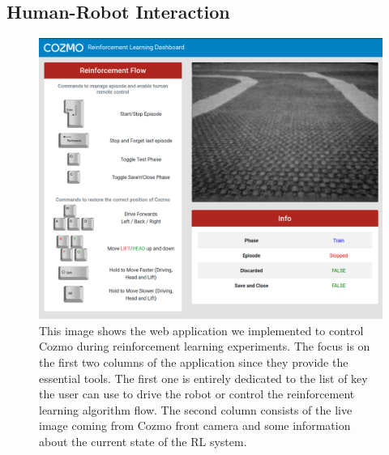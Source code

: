 \subsection{Human-Robot Interaction} \label{subsec:human-robot-interaction}

\begin{figure}

    \centering
    \includegraphics[width=\textwidth]{img/dashboard.png}
    \caption[Web Application implemented to Control Cozmo]{This image shows the web application we implemented to control Cozmo during reinforcement learning experiments.
        The focus is on the first two columns of the application since they provide the essential tools.
        The first one is entirely dedicated to the list of key the user can use to drive the robot or control the reinforcement learning algorithm flow.
        The second column consists of the live image coming from Cozmo front camera and some information about the current state of the RL system.}
    \label{fig:dashboard}
\end{figure}

